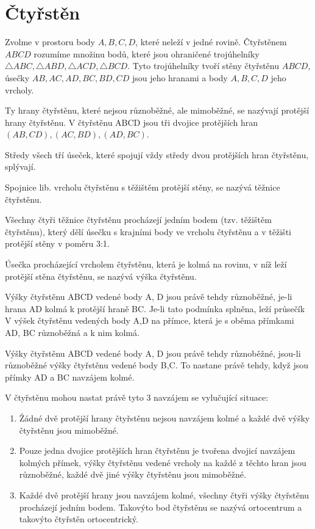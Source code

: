 
\let\braceru=\relax \let\bracelu=\relax 
\def\o#1{\setbox0=
	\hbox{$\kern2pt\overbrace{\kern-2pt#1\kern-2pt}\kern2pt$}\ht0=2.1ex\box0}
\def\to#1{\hbox{#1\rlap{\t{}}}}
\def\rad{\rm{rad}}
\def\f{\frac}
\section{Čtyřstěn}
\Def Zvolme v prostoru body $A,B,C,D$, které neleží
v jedné rovině. Čtyřstěnem $ABCD$ rozumíme
množinu bodů, které jsou ohraničené
trojúhelníky $\triangle ABC , \triangle ABD , \triangle ACD , \triangle BCD$. Tyto
trojúhelníky tvoří stěny čtyřstěnu $ABCD$, úsečky
$AB, AC, AD, BC, BD, CD$ jsou jeho hranami a
body $A,B,C,D$ jeho vrcholy.

\Poz Ty hrany čtyřstěnu, které nejsou různoběžné, ale
mimoběžné, se nazývají protější hrany čtyřstěnu. V čtyřstěnu ABCD jsou tři dvojice
protějších hran $(AB, CD), (AC,BD), (AD,BC)$.

\V Středy všech tří úseček, které spojují vždy středy dvou protějších hran čtyřstěnu,
splývají.

\Def Spojnice lib. vrcholu čtyřstěnu s těžištěm protější stěny, se nazývá těžnice čtyřstěnu.

\V Všechny čtyři těžnice čtyřstěnu procházejí jedním bodem (tzv. těžištěm čtyřstěnu), který
dělí úsečku s krajními body ve vrcholu čtyřstěnu a v těžišti protější stěny v poměru 3:1.

\Def Úsečka procházející vrcholem čtyřstěnu, která je kolmá na rovinu, v níž leží protější stěna
čtyřstěnu, se nazývá výška čtyřstěnu.

\V Výšky čtyřstěnu ABCD vedené body A, D jsou právě tehdy různoběžné, je-li hrana AD
kolmá k protější hraně BC. Je-li tato podmínka splněna, leží průsečík V výšek čtyřstěnu
vedených body A,D na přímce, která je s oběma přímkami AD, BC různoběžná a k nim
kolmá.

\Poz Výšky čtyřstěnu ABCD vedené body A, D jsou právě tehdy různoběžné, jsou-li
různoběžné výšky čtyřstěnu vedené body B,C. To nastane právě tehdy, když jsou přímky
AD a BC navzájem kolmé.

\V V čtyřstěnu mohou nastat právě tyto 3 navzájem se vylučující situace:
\begin{enumerate}
\item Žádné dvě protější hrany čtyřstěnu nejsou navzájem kolmé a každé dvě výšky
čtyřstěnu jsou mimoběžné.
\item Pouze jedna dvojice protějších hran čtyřstěnu je tvořena dvojicí navzájem kolmých
přímek, výšky čtyřstěnu vedené vrcholy na každé z těchto hran jsou různoběžné, každé
dvě jiné výšky čtyřstěnu jsou mimoběžné.
\item Každé dvě protější hrany jsou navzájem kolmé, všechny čtyři výšky čtyřstěnu
procházejí jedním bodem. Takovýto bod čtyřstěnu se nazývá ortocentrum a takovýto
čtyřstěn ortocentrický.
\end{enumerate}

\EndDoc


